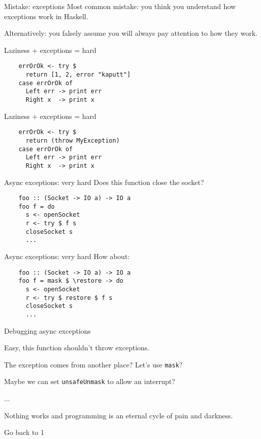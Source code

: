 \documentclass[20pt]{beamer}
\newcommand{\vspaced}{
    \vspace{5mm}
}
\begin{document}


\begin{frame}{Mistake: exceptions}
    Most common mistake: you think you understand how exceptions work in
    Haskell. \\
    \vspaced
    \small{Alternatively: you falsely assume you will always pay attention
    to how they work.}
\end{frame}

\begin{frame}[fragile]{Laziness + exceptions = hard}
    \begin{lstlisting}
    errOrOk <- try $
      return [1, 2, error "kaputt"]
    case errOrOk of
      Left err -> print err
      Right x  -> print x
    \end{lstlisting}
\end{frame}

\begin{frame}[fragile]{Laziness + exceptions = hard}
    \begin{lstlisting}
    errOrOk <- try $
      return (throw MyException)
    case errOrOk of
      Left err -> print err
      Right x  -> print x
    \end{lstlisting}
\end{frame}

\begin{frame}[fragile]{Async exceptions: very hard}
    Does this function close the socket?
    \begin{lstlisting}
    foo :: (Socket -> IO a) -> IO a
    foo f = do
      s <- openSocket
      r <- try $ f s
      closeSocket s
      ...
    \end{lstlisting}
\end{frame}

\begin{frame}[fragile]{Async exceptions: very hard}
    How about:
    \begin{lstlisting}
    foo :: (Socket -> IO a) -> IO a
    foo f = mask $ \restore -> do
      s <- openSocket
      r <- try $ restore $ f s
      closeSocket s
      ...
    \end{lstlisting}
\end{frame}

\begin{frame}{Debugging async exceptions}
    \begin{enumerate}
    \normalsize{\item Easy, this function shouldn't throw exceptions.}
    \small{\item The exception comes from another place? Let's use
        \texttt{mask}?}
    \footnotesize{\item Maybe we can set \texttt{unsafeUnmask} to allow an
        interrupt?}
    \footnotesize{\item ...}
    \tiny{\item Nothing works and programming is an eternal cycle of pain and
        darkness.}
    \tiny{\item Go back to 1}
    \end{enumerate}
\end{frame}
\end{document}
